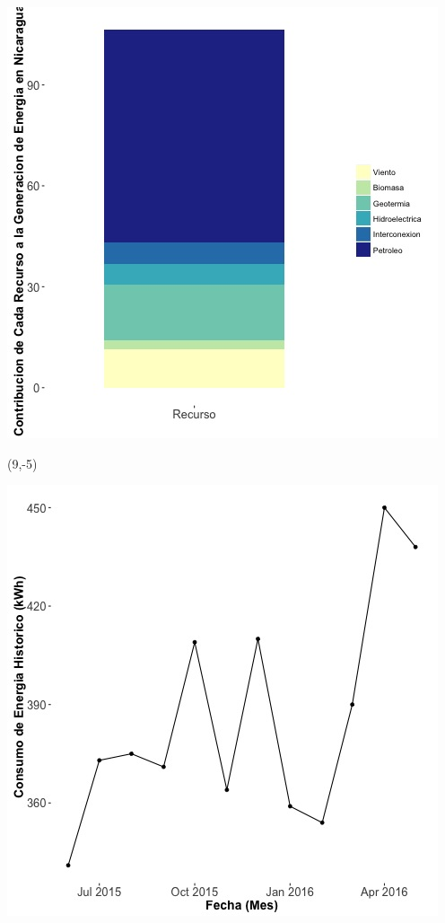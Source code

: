 \documentclass{article}\usepackage[]{graphicx}\usepackage[]{color}
\newenvironment{knitrout}{}{} %
\begin{document}
\begin{knitrout}
\color{fgcolor}
\includegraphics[scale=0.65]{figure/gridplot2.jpg} 
\end{knitrout}

 \begin{textblock}{1}(9,-5)
\begin{minipage}{20em}
\begingroup

\endgroup
\end{minipage}
\end{textblock}

\begin{knitrout}
\color{fgcolor}
\includegraphics[scale=0.65]{figure/A21_historico_energia} 
\end{knitrout}
\end{document}
